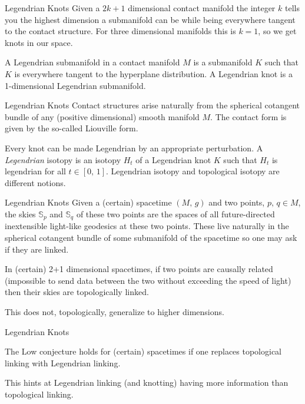 \documentclass{beamer}
\begin{document}
    \begin{frame}{Legendrian Knots}
        Given a $2k+1$ dimensional contact manifold the integer $k$ tells you
        the highest dimension a submanifold can be while being everywhere
        tangent to the contact structure. For three dimensional manifolds this
        is $k=1$, so we get knots in our space.
        \begin{definition}
            A Legendrian submanifold in a contact manifold $M$ is a submanifold
            $K$ such that $K$ is everywhere tangent to the hyperplane
            distribution. A Legendrian knot is a 1-dimensional Legendrian
            submanifold.
        \end{definition}
    \end{frame}
    \begin{frame}{Legendrian Knots}
        Contact structures arise naturally from the spherical cotangent bundle
        of any (positive dimensional) smooth manifold $M$. The contact form is
        given by the so-called Liouville form.
        \par\hfill\par
        Every knot can be made Legendrian by an appropriate perturbation. A
        \textit{Legendrian} isotopy is an isotopy $H_{t}$ of a Legendrian knot
        $K$ such that $H_{t}$ is legendrian for all $t\in[0,\,1]$. Legendrian
        isotopy and topological isotopy are different notions.
    \end{frame}
    \begin{frame}{Legendrian Knots}
        Given a (certain) spacetime $(M,\,g)$ and two points, $p,\,q\in{M}$,
        the skies $\mathbb{S}_{p}$ and $\mathbb{S}_{q}$ of these two points
        are the spaces of all future-directed inextensible light-like geodesics
        at these two points. These live naturally in the spherical cotangent
        bundle of some submanifold of the
        spacetime so one may ask if they are linked.
        \begin{theorem}
            In (certain) 2+1 dimensional spacetimes, if two points are causally
            related (impossible to send data between the two without exceeding
            the speed of light) then their skies are topologically linked.
        \end{theorem}
        This does not, topologically, generalize to higher dimensions.
    \end{frame}
    \begin{frame}{Legendrian Knots}
        \begin{theorem}
            The Low conjecture holds for (certain) spacetimes if one replaces
            topological linking with Legendrian linking.
        \end{theorem}
        This hints at Legendrian linking (and knotting) having more information
        than topological linking.
    \end{frame}
\end{document}
